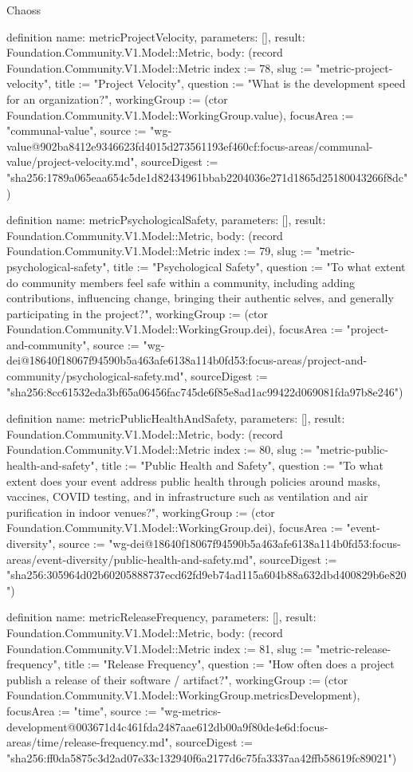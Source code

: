 \begin{lexlean}{Chaoss}
\begin{semanticmodule}
definition{
  name: metricProjectVelocity,
  parameters: [],
  result: Foundation.Community.V1.Model::Metric,
  body: (record Foundation.Community.V1.Model::Metric {index := 78, slug := "metric-project-velocity", title := "Project Velocity", question := "What is the development speed for an organization?", workingGroup := (ctor Foundation.Community.V1.Model::WorkingGroup.value), focusArea := "communal-value", source := "wg-value@902ba8412e9346623fd4015d273561193ef460cf:focus-areas/communal-value/project-velocity.md", sourceDigest := "sha256:1789a065eaa654c5de1d82434961bbab2204036e271d1865d25180043266f8dc"})
}

definition{
  name: metricPsychologicalSafety,
  parameters: [],
  result: Foundation.Community.V1.Model::Metric,
  body: (record Foundation.Community.V1.Model::Metric {index := 79, slug := "metric-psychological-safety", title := "Psychological Safety", question := "To what extent do community members feel safe within a community, including adding contributions, influencing change, bringing their authentic selves, and generally participating in the project?", workingGroup := (ctor Foundation.Community.V1.Model::WorkingGroup.dei), focusArea := "project-and-community", source := "wg-dei@18640f18067f94590b5a463afe6138a114b0fd53:focus-areas/project-and-community/psychological-safety.md", sourceDigest := "sha256:8cc61532eda3bf65a06456fac745de6f85e8ad1ac99422d069081fda97b8e246"})
}

definition{
  name: metricPublicHealthAndSafety,
  parameters: [],
  result: Foundation.Community.V1.Model::Metric,
  body: (record Foundation.Community.V1.Model::Metric {index := 80, slug := "metric-public-health-and-safety", title := "Public Health and Safety", question := "To what extent does your event address public health through policies around masks, vaccines, COVID testing, and in infrastructure such as ventilation and air purification in indoor venues?", workingGroup := (ctor Foundation.Community.V1.Model::WorkingGroup.dei), focusArea := "event-diversity", source := "wg-dei@18640f18067f94590b5a463afe6138a114b0fd53:focus-areas/event-diversity/public-health-and-safety.md", sourceDigest := "sha256:305964d02b60205888737ecd62fd9eb74ad115a604b88a632dbd400829b6e820"})
}

definition{
  name: metricReleaseFrequency,
  parameters: [],
  result: Foundation.Community.V1.Model::Metric,
  body: (record Foundation.Community.V1.Model::Metric {index := 81, slug := "metric-release-frequency", title := "Release Frequency", question := "How often does a project publish a release of their software / artifact?", workingGroup := (ctor Foundation.Community.V1.Model::WorkingGroup.metricsDevelopment), focusArea := "time", source := "wg-metrics-development@003671d4c461fda2487aae612db00a9f80de4e6d:focus-areas/time/release-frequency.md", sourceDigest := "sha256:ff0da5875c3d2ad07e33c132940f6a2177d6c75fa3337aa42ffb58619fc89021"})
}


\end{semanticmodule}
\end{lexlean}
